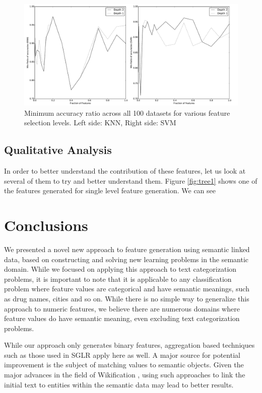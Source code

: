 \documentclass{article}
\theoremstyle{definition}
\begin{document}
\begin{figure}[H]
	\centering
	\includegraphics[width=\linewidth]{ratios_min.pdf}
	\caption{Minimum accuracy ratio across all 100 datasets for various feature selection levels. Left side: KNN, Right side: SVM}
	\label{fig:ratios_min}
\end{figure}


\subsection{Qualitative Analysis}
In order to better understand the contribution of these features, let us look at several of them to try and better understand them. Figure \ref{fig:tree1} shows one of the features generated for single level feature generation. We can see %


\section{Conclusions}
We presented a novel new approach to feature generation using semantic linked data, based on constructing and solving new learning problems in the semantic domain. While we focused on applying this approach to text categorization problems, it is important to note that it is applicable to any classification problem where feature values are categorical and have semantic meanings, such as drug names, cities and so on. While there is no simple way to generalize this approach to numeric features, we believe there are numerous domains where feature values do have semantic meaning, even excluding text categorization problems.

While our approach only generates binary features, aggregation based techniques such as those used in SGLR apply here as well. A major source for potential improvement is the subject of matching values to semantic objects. Given the major advances in the field of Wikification \citep{bunescu2006using, cheng2013relational}, using such approaches to link the initial text to entities within the semantic data may lead to better results.
\end{document}
